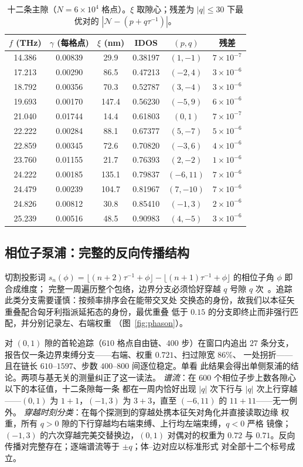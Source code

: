 \documentclass[11pt]{article}
\begin{document}
\begin{table}[H]
\centering
\caption{十二条主隙（$N = 6\times10^4$ 格点）。$\xi$ 取隙心；残差为
$|q| \le 30$ 下最优对的 $|\mathcal{N} - (p + q\tau^{-1})|$。}
\begin{tabular}{cccccc}
\hline\hline
$f$ (THz) & $\gamma$ (每格点) & $\xi$ (nm) & IDOS & $(p,q)$ & 残差\\
\hline
14.386 & 0.00839 & 29.9 & 0.38197 & $(1,-1)$ & $7{\times}10^{-7}$\\
17.213 & 0.00290 & 86.5 & 0.47213 & $(-2,4)$ & $3{\times}10^{-6}$\\
18.792 & 0.00356 & 70.3 & 0.52787 & $(3,-4)$ & $3{\times}10^{-6}$\\
19.693 & 0.00170 & 147.4 & 0.56230 & $(-5,9)$ & $6{\times}10^{-6}$\\
21.040 & 0.01744 & 14.4 & 0.61803 & $(0,1)$ & $7{\times}10^{-7}$\\
22.222 & 0.00284 & 88.1 & 0.67377 & $(5,-7)$ & $5{\times}10^{-6}$\\
22.859 & 0.00345 & 72.6 & 0.70820 & $(-3,6)$ & $4{\times}10^{-6}$\\
23.760 & 0.01155 & 21.7 & 0.76393 & $(2,-2)$ & $1{\times}10^{-6}$\\
24.222 & 0.00185 & 135.1 & 0.79837 & $(-6,11)$ & $7{\times}10^{-6}$\\
24.479 & 0.00239 & 104.7 & 0.81967 & $(7,-10)$ & $7{\times}10^{-6}$\\
24.826 & 0.00812 & 30.8 & 0.85410 & $(-1,3)$ & $2{\times}10^{-6}$\\
25.239 & 0.00516 & 48.5 & 0.90983 & $(4,-5)$ & $3{\times}10^{-6}$\\
\hline\hline
\end{tabular}
\end{table}

\subsection{相位子泵浦：完整的反向传播结构}
\label{sec:pump}

切割投影词
$s_n(\phi) = \lfloor (n{+}2)\tau^{-1}{+}\phi \rfloor -
\lfloor (n{+}1)\tau^{-1}{+}\phi \rfloor$ 的相位子角 $\phi$ 即合成维度；
完整一周遍历整个包络，边界分支必须恰好穿越 $q$ 号隙 $q$
次~\cite{kraus2012}。追踪此类分支需要谨慎：按频率排序会在能带交叉处
交换态的身份，故我们以本征矢重叠配合匈牙利指派延拓态的身份，最优重叠
低于 $0.15$ 的分支即终止而非强行匹配，并分别记录左、右端权重
（图~\ref{fig:phason}）。

对 $(0,1)$ 隙的首轮追踪（$610$ 格点自由链、$400$ 步）在窗口内追出 $27$
条分支，报告仅一条边界束缚分支——右端、权重 $0.721$、扫过隙宽 $86\%$、
一处拐折——且在链长 $610$--$1597$、步数 $400$--$800$ 间逐位稳定。单看
此结果会得出单侧泵浦的结论。两项与基无关的测量纠正了这一读法。
\emph{谱流}：在 $600$ 个相位子步上数各隙心以下的本征值，十二条隙每一条
都在一周内恰好出现 $|q|$ 次下行与 $|q|$ 次上行穿越——$(0,1)$ 为
$1{+}1$，$(-1,3)$ 为 $3{+}3$，直至 $(-6,11)$ 的 $11{+}11$——无一例外。
\emph{穿越时刻分类}：在每个探测到的穿越处携本征矢对角化并直接读取边缘
权重，所有 $q > 0$ 隙的下行穿越均右端束缚、上行均左端束缚，$q < 0$ 严格
镜像；$(-1,3)$ 的六次穿越完美交替换边，$(0,1)$ 对偶对的权重为 $0.72$ 与
$0.71$。反向传播对完整存在；逐端谱流等于 $\pm q$；体--边对应以标准形式
对全部十二个标号成立。
\end{document}
